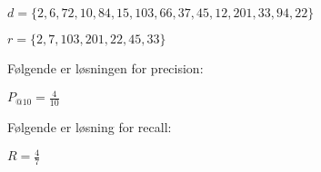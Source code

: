 \vspace{3 mm}

$d = \{2,6,72,10,84,15,103,66,37,45,12,201,33,94,22\}$

\vspace{3 mm}

$r = \{2,7,103,201,22,45,33\}$
\vspace{6 mm}

\noindent Følgende er løsningen for precision:

\vspace{3 mm}

\begin{center}
$P_{@10} = \frac{4}{10}$
\end{center}

\vspace{3 mm}

\noindent Følgende er løsning for recall:

\vspace{3 mm}

\begin{center}
$R = \frac{4}{7}$
\end{center}
